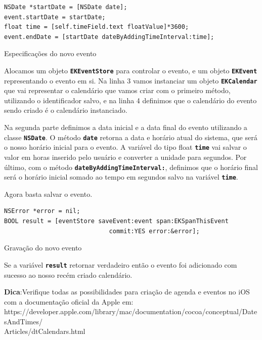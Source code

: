 \documentclass[a4paper,12pt,brazil,doubleside]{book}
\begin{document}
\begin{singlespace}
\begin{listing}[H]
\begin{verbatim}
NSDate *startDate = [NSDate date];
event.startDate = startDate;
float time = [self.timeField.text floatValue]*3600;
event.endDate = [startDate dateByAddingTimeInterval:time];
\end{verbatim}
\caption{Especificações do novo evento}
\end{listing}


Alocamos um objeto \texttt{\textbf{EKEventStore}} para controlar o evento, e um objeto \texttt{\textbf{EKEvent}} representando o evento em si. Na linha 3 vamos instanciar um objeto \texttt{\textbf{EKCalendar}} que vai representar o calendário que vamos criar com o primeiro método, utilizando o identificador salvo, e na linha 4 definimos que o calendário do evento sendo criado é o calendário instanciado.

Na segunda parte definimos a data inicial e a data final do evento utilizando a classe \texttt{\textbf{NSDate}}. O método \texttt{\textbf{date}} retorna a data e horário atual do sistema, que será o nosso horário inicial para o evento. A variável do tipo float \texttt{\textbf{time}} vai salvar o valor em horas inserido pelo usuário e converter a unidade para segundos. Por último, com o método \texttt{\textbf{dateByAddingTimeInterval:}}, definimos que o horário final será o horário inicial somado ao tempo em segundos salvo na variável \texttt{\textbf{time}}.

Agora basta salvar o evento.

\begin{listing}[H]
\begin{verbatim}
NSError *error = nil;
BOOL result = [eventStore saveEvent:event span:EKSpanThisEvent
                             commit:YES error:&error];
\end{verbatim}
\caption{Gravação do novo evento}
\end{listing}


Se a variável \texttt{\textbf{result}} retornar verdadeiro então o evento foi adicionado com sucesso ao nosso recém criado calendário.

\bigskip

\begin{framed}

\textbf{Dica}:Verifique todas as possibilidades para criação de agenda e eventos no iOS com a documentação oficial da Apple em:\\ https://developer.apple.com/library/mac/documentation/cocoa/conceptual/DatesAndTimes/\\Articles/dtCalendars.html
\end{framed}


\end{singlespace}
\end{document}
